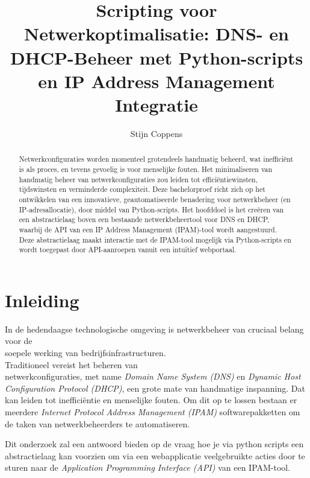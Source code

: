 \documentclass{hogent-article}
\title{Scripting voor Netwerkoptimalisatie: DNS- en DHCP-Beheer met Python-scripts en IP Address Management Integratie}
\author{Stijn Coppens}
\begin{document}
\begin{abstract}
Netwerkconfiguraties worden momenteel grotendeels handmatig beheerd, wat inefficiënt is als proces, en tevens gevoelig is voor menselijke fouten. Het minimaliseren van handmatig beheer van netwerkconfiguraties zou leiden tot efficiëntiewinsten, tijdswinsten en verminderde complexiteit.
Deze bachelorproef richt zich op het ontwikkelen van een innovatieve, geautomatiseerde benadering voor netwerkbeheer (en IP-adresallocatie), door
middel van Python-scripts.
Het hoofddoel is het creëren van een abstractielaag boven een bestaande netwerkbeheertool voor DNS en DHCP,
waarbij de API van een IP Address Management (IPAM)-tool wordt aangestuurd. Deze abstractielaag maakt interactie met de IPAM-tool mogelijk via Python-scripts en wordt toegepast door API-aanroepen vanuit een intuïtief webportaal.
\end{abstract}
\tableofcontents

\bigskip

\section{Inleiding}%
\label{sec:inleiding}
In de hedendaagse technologische omgeving is netwerkbeheer van cruciaal belang voor de \\soepele werking van bedrijfsinfrastructuren. 
\\ Traditioneel vereist het beheren van \\netwerkconfiguraties, met name \textit{Domain Name System (DNS)} en \textit{Dynamic Host Configuration Protocol (DHCP)}, een grote mate van handmatige inspanning. Dat kan leiden tot inefficiëntie en menselijke fouten. 
Om dit op te lossen bestaan er meerdere \textit{Internet Protocol Address Management (IPAM)} softwarepakketten om de taken van netwerkbeheerders te automatiseren. 


Dit onderzoek zal een antwoord bieden op de vraag hoe je via python scripts een abstractielaag kan voorzien om via een webapplicatie veelgebruikte acties door te sturen naar de \textit{Application Programming Interface (API)} van een IPAM-tool. 
\end{document}
